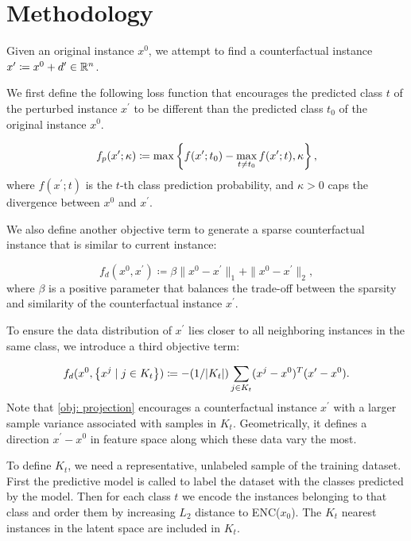 \section{Methodology}
\label{sec:Methodology}

Given an original instance $x^0$, we attempt to find a counterfactual instance $x^\prime \coloneqq x^0 +d^\prime \in \mathbb{R}^n$.  

We first define the following loss function that encourages the predicted class $t$ of the perturbed instance $x^\prime$ to be different than the predicted class $t_0$ of the
original instance $x^0$.

\begin{equation}
   f_p(x^\prime; \kappa) \coloneqq \max \left \{ f(x^\prime; t_0) - \max_{t \neq t_0} f(x^\prime; t), \kappa \right \}, \label{obj: prediction}
\end{equation}
where $f(x^\prime; t)$ is the $t$-th class prediction probability, and $\kappa > 0$ caps the divergence between $x^0$ and $x^\prime$. 

We also define another objective term to generate a sparse counterfactual instance that is similar to current instance:

\begin{equation}
   f_d(x^0, x^\prime) \coloneqq \beta \| x^0 - x^\prime  \|_1 +  \| x^0 - x^\prime  \|_2, \label{obj: distance}
\end{equation}
where $\beta$ is a  positive parameter that balances the trade-off between the sparsity and similarity of the counterfactual instance $x^\prime$.

To ensure the data distribution of $x^\prime$ lies closer to all neighboring instances in the same class, we introduce a third objective term:

\begin{equation}
   f_d(x^0, \left \{ x^j  \mid j \in K_t \right \}) \coloneqq -(1/|K_t|)  \sum_{j \in K_t} (x^j - x^0)^T (x^\prime - x^0). \label{obj: projection}
\end{equation}
Note that \eqref{obj: projection} encourages a counterfactual instance $x^\prime$ with a larger sample variance associated with samples in $K_t$. Geometrically, it defines a direction $x^\prime - x^0$ in feature space along which these data vary the most. 

To define $K_t$, we need a representative, unlabeled sample of the training dataset. First the predictive model is called to label the dataset with the classes predicted by the model. Then
for each class $t$ we encode the instances belonging to that class and order them by increasing $L_2$ distance to ENC($x_0$). The $K_t$ nearest instances in the latent space are included in $K_t$.

